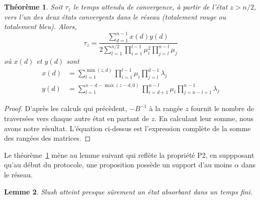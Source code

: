 \documentclass[letterpaper,twocolumn,10pt]{article}
\newcommand\ddfrac[2]{\frac{\displaystyle #1}{\displaystyle #2}}
\newtheorem{theorem}{Théorème}
\newtheorem{lemma}[theorem]{Lemme}
\theoremstyle{definition}
\begin{document}
\begin{appendices}
\begin{theorem}
\label{theorem:mean-convergence-time}
Soit $\tau_z$ le temps attendu de convergence, à partir de l'état $z > n/2$, vers l'un des deux états convergents dans le réseau (totalement rouge ou totalement bleu). Alors,
\begin{equation}
\tau_z = \ddfrac{\sum_{d = 1}^{n-1}x(d)y(d)}{2\sum_{l = 1}^{n/2}\prod_{i=1}^{l-1}\mu_i^2\prod_{j=l}^{n-l}\mu_j}
\end{equation}
où $x(d)$ et $y(d)$ sont
\begin{equation}
\begin{split}
x(d) &= \sum_{l = 1}^{\min(z, d)} \prod_{i=1}^{l-1} \mu_i \prod_{j = l}^{d-1} \lambda_j\\
y(d) &= \sum_{l = 1}^{n - d - \max(z-d, 0)} \prod_{i = d+1}^{n-l} \mu_i \prod_{j = n - l + 1}^{n - 1} \lambda_j
\end{split}
\end{equation}
\end{theorem}

\begin{proof}
D'après les calculs qui précèdent, $-B^{-1}$ à la rangée $z$ fournit le nombre de traversées vers chaque autre état en partant de $z$. En calculant leur somme, nous avons notre résultat. L'équation ci-dessus est l'expression complète de la somme des rangées des matrices.
\end{proof}

Le théorème~\ref{theorem:mean-convergence-time} mène au lemme suivant qui reflète %
la propriété P2, en suppposant qu'au début du protocole, une proposition possède un support d'au moins $\alpha$ dans le réseau.
\begin{lemma}
Slush atteint presque sûrement un état absorbant dans un temps fini.
\label{lemma:finitetermination}
\end{lemma}


\end{appendices}
\end{document}
